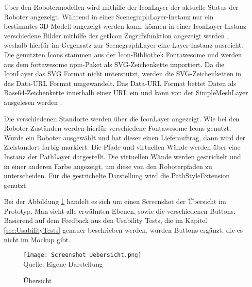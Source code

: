 Über den Robotermodellen wird mithilfe der IconLayer der aktuelle Status der Roboter angezeigt. Während in einer ScenegraphLayer-Instanz nur ein bestimmtes 3D-Modell angezeigt werden kann, können in einer IconLayer-Instanz verschiedene Bilder mithilfe der getIcon Zugriffsfunktion angezeigt werden \cite{DeckglIconLayer}, weshalb hierfür im Gegensatz zur ScenegraphLayer eine Layer-Instanz ausreicht. Die genutzten Icons stammen aus der Icon-Bibliothek Fontawesome und werden aus dem fortawesome \ac{npm}-Paket als \ac{SVG}-Zeichenkette importiert. Da die IconLayer das \ac{SVG} Format nicht unterstützt, werden die \ac{SVG}-Zeichenketten in das Data-\ac{URL} Format umgewandelt. Das Data-\ac{URL} Format bettet Daten als \gls{Base64}-Zeichenkette innerhalb einer \ac{URL} ein \cite{DataUrl} und kann von der SimpleMeshLayer ausgelesen werden \cite{DeckglIconLayer}.

Die verschiedenen Standorte werden über die IconLayer angezeigt. Wie bei den Roboter-Zuständen werden hierfür verschiedene Fontawesome-Icons genutzt. Wurde ein Roboter ausgewählt und hat dieser einen Lieferauftrag, dann wird der Zielstandort farbig markiert. Die Pfade und virtuellen Wände werden über eine Instanz der PathLayer \cite{DeckglPathLayer} dargestellt. Die virtuellen Wände werden gestrichelt und in einer anderen Farbe angezeigt, um diese von den Roboterpfaden zu unterscheiden. Für die gestrichelte Darstellung wird die PathStyleExtension \cite{DeckglPathStyleExtension} genutzt.

Bei der Abbildung \ref{fig:OverviewScreenshot} handelt es sich um einen Screenshot der Übersicht im Prototyp. Man sieht alle erwähnten Ebenen, sowie die verschiedenen Buttons. Basierend auf dem Feedback aus den Usability Tests, die im Kapitel \ref{sec:UsabilityTests} genauer beschrieben werden, wurden Buttons ergänzt, die es nicht im Mockup gibt.

\begin{figure}[H]
    \caption{Übersicht}\label{fig:OverviewScreenshot}
    \texttt{[image: Screenshot Uebersicht.png]}
    \\
    Quelle: Eigene Darstellung
\end{figure}

